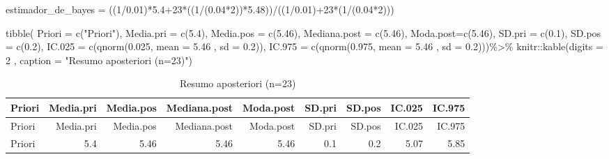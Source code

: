 \documentclass[
]{article}
\newenvironment{Shaded}{\begin{snugshade}}{\end{snugshade}}
\newcommand{\AttributeTok}[1]{\textcolor[rgb]{0.77,0.63,0.00}{#1}}
\newcommand{\DecValTok}[1]{\textcolor[rgb]{0.00,0.00,0.81}{#1}}
\newcommand{\FloatTok}[1]{\textcolor[rgb]{0.00,0.00,0.81}{#1}}
\newcommand{\FunctionTok}[1]{\textcolor[rgb]{0.00,0.00,0.00}{#1}}
\newcommand{\NormalTok}[1]{#1}
\newcommand{\OtherTok}[1]{\textcolor[rgb]{0.56,0.35,0.01}{#1}}
\newcommand{\SpecialCharTok}[1]{\textcolor[rgb]{0.00,0.00,0.00}{#1}}
\newcommand{\StringTok}[1]{\textcolor[rgb]{0.31,0.60,0.02}{#1}}
\begin{document}
\begin{Shaded}
\begin{Highlighting}[]
\NormalTok{estimador\_de\_bayes }\OtherTok{=}\NormalTok{ ((}\DecValTok{1}\SpecialCharTok{/}\FloatTok{0.01}\NormalTok{)}\SpecialCharTok{*}\FloatTok{5.4}\SpecialCharTok{+}\DecValTok{23}\SpecialCharTok{*}\NormalTok{((}\DecValTok{1}\SpecialCharTok{/}\NormalTok{(}\FloatTok{0.04}\SpecialCharTok{*}\DecValTok{2}\NormalTok{))}\SpecialCharTok{*}\FloatTok{5.48}\NormalTok{))}\SpecialCharTok{/}\NormalTok{((}\DecValTok{1}\SpecialCharTok{/}\FloatTok{0.01}\NormalTok{)}\SpecialCharTok{+}\DecValTok{23}\SpecialCharTok{*}\NormalTok{(}\DecValTok{1}\SpecialCharTok{/}\NormalTok{(}\FloatTok{0.04}\SpecialCharTok{*}\DecValTok{2}\NormalTok{)))}
\end{Highlighting}
\end{Shaded}

\begin{Shaded}
\begin{Highlighting}[]
\FunctionTok{tibble}\NormalTok{(      }\AttributeTok{Priori =} \FunctionTok{c}\NormalTok{(}\StringTok{"Priori"}\NormalTok{),}
             \AttributeTok{Media.pri =} \FunctionTok{c}\NormalTok{(}\FloatTok{5.4}\NormalTok{),}
             \AttributeTok{Media.pos =} \FunctionTok{c}\NormalTok{(}\FloatTok{5.46}\NormalTok{),}
             \AttributeTok{Mediana.post =} \FunctionTok{c}\NormalTok{(}\FloatTok{5.46}\NormalTok{),}
             \AttributeTok{Moda.post=}\FunctionTok{c}\NormalTok{(}\FloatTok{5.46}\NormalTok{),}
             \AttributeTok{SD.pri =} \FunctionTok{c}\NormalTok{(}\FloatTok{0.1}\NormalTok{),}
             \AttributeTok{SD.pos =} \FunctionTok{c}\NormalTok{(}\FloatTok{0.2}\NormalTok{),}
             \AttributeTok{IC.025 =} \FunctionTok{c}\NormalTok{(}\FunctionTok{qnorm}\NormalTok{(}\FloatTok{0.025}\NormalTok{, }\AttributeTok{mean =} \FloatTok{5.46}\NormalTok{ , }\AttributeTok{sd =} \FloatTok{0.2}\NormalTok{)),}
             \AttributeTok{IC.975 =} \FunctionTok{c}\NormalTok{(}\FunctionTok{qnorm}\NormalTok{(}\FloatTok{0.975}\NormalTok{, }\AttributeTok{mean =} \FloatTok{5.46}\NormalTok{ , }\AttributeTok{sd =} \FloatTok{0.2}\NormalTok{)))}\SpecialCharTok{\%\textgreater{}\%}
\NormalTok{  knitr}\SpecialCharTok{::}\FunctionTok{kable}\NormalTok{(}\AttributeTok{digits =} \DecValTok{2}\NormalTok{           , }\AttributeTok{caption =} \StringTok{"Resumo aposteriori (n=23)"}\NormalTok{)}
\end{Highlighting}
\end{Shaded}

\begin{longtable}[]{@{}lrrrrrrrr@{}}
\caption{Resumo aposteriori (n=23)}\tabularnewline
\toprule
Priori & Media.pri & Media.pos & Mediana.post & Moda.post & SD.pri &
SD.pos & IC.025 & IC.975 \\
\midrule
\endfirsthead
\toprule
Priori & Media.pri & Media.pos & Mediana.post & Moda.post & SD.pri &
SD.pos & IC.025 & IC.975 \\
\midrule
\endhead
Priori & 5.4 & 5.46 & 5.46 & 5.46 & 0.1 & 0.2 & 5.07 & 5.85 \\
\bottomrule
\end{longtable}
\end{document}
